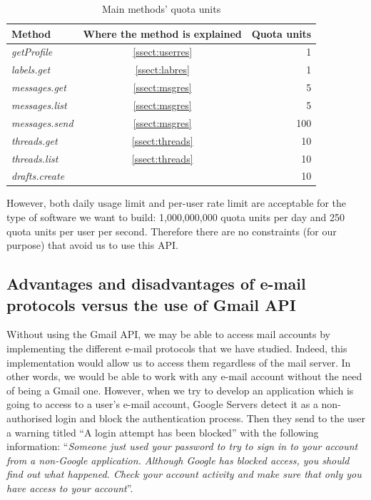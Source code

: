 \begin{table}[h]
	\centering
	\begin{tabular}{|l c r|}
		\hline
		\textbf{Method} & \textbf{Where the method is explained} & \textbf{Quota units} \\
		\hline\hline
		\textit{getProfile} & \ref{ssect:userres} & 1\\ \hline
		\textit{labels.get} & \ref{ssect:labres} & 1\\ \hline
		\textit{messages.get} & \ref{ssect:msgres} & 5\\ \hline
		\textit{messages.list} & \ref{ssect:msgres} & 5\\ \hline
		\textit{messages.send} & \ref{ssect:msgres} & 100\\ \hline
		\textit{threads.get} & \ref{ssect:threads} & 10\\ \hline
		\textit{threads.list} & \ref{ssect:threads} & 10\\ \hline
		\textit{drafts.create} & \citep[/v1/reference/users/drafts]{gmailAPI} & 10\\ \hline
	\end{tabular}
	\caption{Main methods' quota units}
	\label{tab:quotaUnits}
\end{table}

However, both daily usage limit and per-user rate limit are acceptable for the type of software we want to build: 1,000,000,000 quota units per day and 250 quota units per user per second. Therefore there are no constraints (for our purpose) that avoid us to use this API.

\subsection{Advantages and disadvantages of e-mail protocols versus the use of Gmail API} \label{ssect:protvsapi}
Without using the Gmail API, we may be able to access mail accounts by implementing the different e-mail protocols that we have studied. Indeed, this implementation would allow us to access them regardless of the mail server. In other words, we would be able to work with any e-mail account without the need of being a Gmail one. However, when we try to develop an application which is going to access to a user's e-mail account, Google Servers detect it as a non-authorised login and block the authentication process. Then they send to the user a warning titled ``A login attempt has been blocked'' with the following information: ``\textit{Someone just used your password to try to sign in to your account from a non-Google application. Although Google has blocked access, you should find out what happened. Check your account activity and make sure that only you have access to your account}''.

